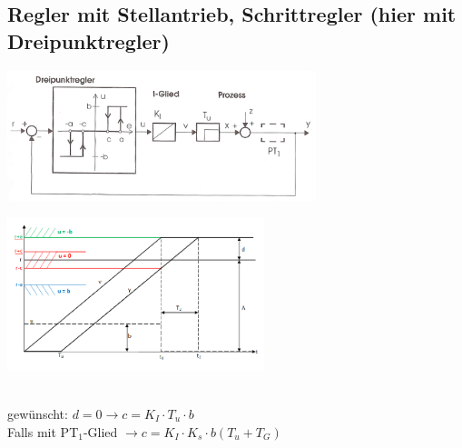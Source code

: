 \subsection{Regler mit Stellantrieb, Schrittregler (hier mit Dreipunktregler) }	
\begin{minipage}{9cm}
		\includegraphics[width=9cm]{./bilder/Dreipunktregler.jpg}
        \end{minipage}
		\begin{minipage}{7.5cm}
        \includegraphics[width=7.5cm]{./bilder/Dreipunktregler_dia.png}
        \end{minipage}\\
		gewünscht: $d = 0 \rightarrow c = K_I \cdot T_u \cdot b$\\
		Falls mit PT$_1$-Glied $\rightarrow c = K_I \cdot K_s \cdot b (T_u + T_G)$
		\newpage